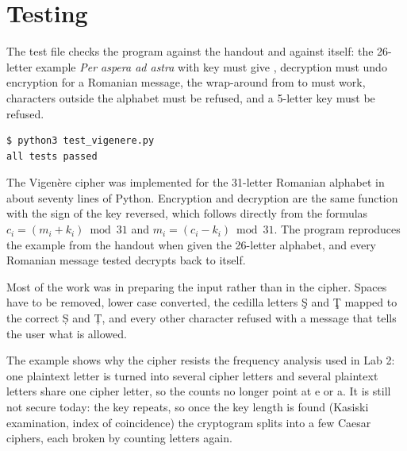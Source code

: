 \documentclass[11pt,a4paper]{article}
\begin{document}
\section{Testing}\label{sec:tests}

The test file checks the program against the handout and against itself: the 26-letter example
\textit{Per aspera ad astra} with key  must give , decryption
must undo encryption for a Romanian message, the wrap-around from  to  must work,
characters outside the alphabet must be refused, and a 5-letter key must be refused.



\begin{lstlisting}[caption={Running the tests},label={fig:testrun}]
$ python3 test_vigenere.py
all tests passed
\end{lstlisting}


The Vigenère cipher was implemented for the 31-letter Romanian alphabet in about seventy lines of
Python. Encryption and decryption are the same function with the sign of the key reversed, which
follows directly from the formulas $c_i = (m_i + k_i) \bmod 31$ and $m_i = (c_i - k_i) \bmod 31$.
The program reproduces the example from the handout when given the 26-letter alphabet, and every
Romanian message tested decrypts back to itself.

Most of the work was in preparing the input rather than in the cipher. Spaces have to be removed,
lower case converted, the cedilla letters Ş and Ţ mapped to the correct Ș and Ț, and every other
character refused with a message that tells the user what is allowed.

The example shows why the cipher resists the frequency analysis used in Lab 2: one plaintext letter
is turned into several cipher letters and several plaintext letters share one cipher letter, so the
counts no longer point at e or a. It is still not secure today: the key repeats, so once the key
length is found (Kasiski examination, index of coincidence) the cryptogram splits into a few Caesar
ciphers, each broken by counting letters again.
\end{document}
